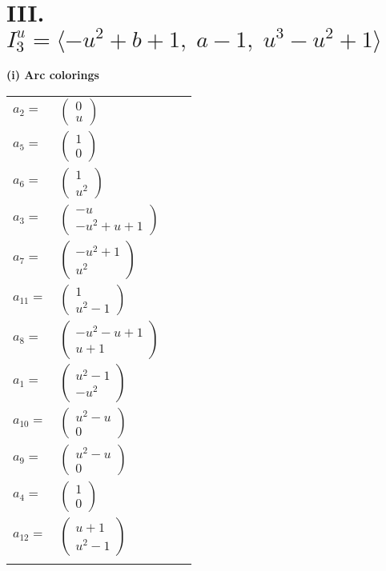 \documentclass[1p]{elsarticle_modified}
\theoremstyle{definition}
\begin{document}
\centering \section*{III. $I^u_{3}= \langle - u^2+b+1,\;a-1,\;u^3- u^2+1 \rangle$}
\flushleft \textbf{(i) Arc colorings}\\
\begin{tabular}{m{7pt} m{180pt} m{7pt} m{180pt} }
\flushright $a_{2}=$&$\begin{pmatrix}0\\u\end{pmatrix}$ \\
\flushright $a_{5}=$&$\begin{pmatrix}1\\0\end{pmatrix}$ \\
\flushright $a_{6}=$&$\begin{pmatrix}1\\u^2\end{pmatrix}$ \\
\flushright $a_{3}=$&$\begin{pmatrix}- u\\- u^2+u+1\end{pmatrix}$ \\
\flushright $a_{7}=$&$\begin{pmatrix}- u^2+1\\u^2\end{pmatrix}$ \\
\flushright $a_{11}=$&$\begin{pmatrix}1\\u^2-1\end{pmatrix}$ \\
\flushright $a_{8}=$&$\begin{pmatrix}- u^2- u+1\\u+1\end{pmatrix}$ \\
\flushright $a_{1}=$&$\begin{pmatrix}u^2-1\\- u^2\end{pmatrix}$ \\
\flushright $a_{10}=$&$\begin{pmatrix}u^2- u\\0\end{pmatrix}$ \\
\flushright $a_{9}=$&$\begin{pmatrix}u^2- u\\0\end{pmatrix}$ \\
\flushright $a_{4}=$&$\begin{pmatrix}1\\0\end{pmatrix}$ \\
\flushright $a_{12}=$&$\begin{pmatrix}u+1\\u^2-1\end{pmatrix}$\\&\end{tabular}
\end{document}
